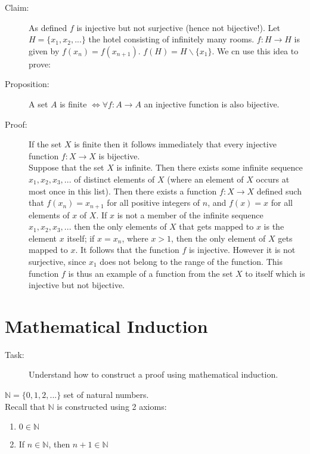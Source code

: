 \documentclass[10pt]{article}
\begin{document}
	\begin{description}
		\item[Claim:] As defined $f$ is injective but not surjective (hence not bijective!). Let $H = \{x_1, x_2,...\}$ the hotel consisting of infinitely many rooms. $f: H \rightarrow H$ is given by $f(x_n) = f(x_{n+1})$. $f(H) = H \backslash \{x_1\}$. We cn use this idea to prove:
		\item[Proposition:] A set $A$ is finite $\Leftrightarrow \forall f:A \rightarrow A$ an injective function is also bijective.
		\item[Proof:] If the set $X$ is finite then it follows immediately that every injective function $f:X \rightarrow X$ is bijective. \\
		Suppose that the set $X$ is infinite. Then there exists some infinite sequence $x_1, x_2, x_3, ...$ of distinct elements of $X$ (where an element of $X$ occurs at most once in this list). Then there exists a function $f:X \rightarrow X$ defined such that $f(x_n) = x_{n+1}$ for all positive integers of $n$, and $f(x) = x$ for all elements of $x$ of $X$. If $x$ is not a member of the infinite sequence $x_1, x_2, x_3, ...$ then the only elements of $X$ that gets mapped to $x$ is the element $x$ itself; if $x = x_n$, where $x>1$, then the only element of $X$ gets mapped to $x$. It follows that the function $f$ is injective. However it is not surjective, since $x_1$ does not belong to the range of the function. This function $f$ is thus an example of a function from the set $X$ to itself which is injective but not bijective.
	\end{description}
	
	\section{Mathematical Induction}
	\begin{description}
		\item[Task:] Understand how to construct a proof using mathematical induction.
	\end{description}
	$\mathbb{N} = \{0, 1, 2, ...\}$ set of natural numbers. \\
	Recall that $\mathbb{N}$ is constructed using 2 axioms:
	\begin{enumerate}
		\item $0 \in \mathbb{N}$
		\item If $n \in \mathbb{N}$, then $n+1 \in \mathbb{N}$
	\end{enumerate}
	
\end{document}
